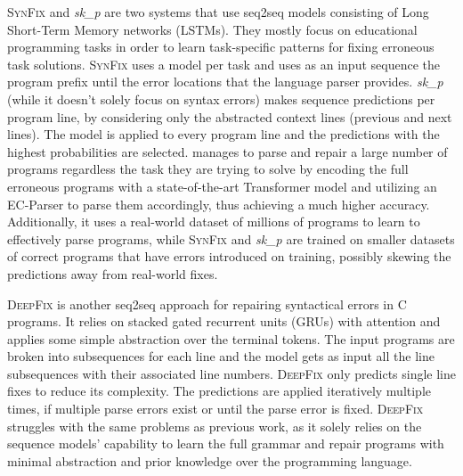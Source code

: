 %
\textsc{SynFix} \citep{Bhatia2016} and \emph{sk\_p} \citep{Pu2016} are two
systems that use seq2seq models consisting of Long Short-Term Memory networks
(LSTMs). They mostly focus on educational programming tasks in order to learn
task-specific patterns for fixing erroneous task solutions. \textsc{SynFix} uses
a model per task and uses as an input sequence the program prefix until the
error locations that the language parser provides. \emph{sk\_p} (while it
doesn't solely focus on syntax errors) makes sequence predictions per program
line, by considering only the abstracted context lines (previous and next
lines). The model is applied to every program line and the predictions with the
highest probabilities are selected. \toolname manages to parse and repair a
large number of programs regardless the task they are trying to solve by
encoding the full erroneous programs with a state-of-the-art Transformer model
and utilizing an EC-Parser to parse them accordingly, thus achieving a much
higher accuracy. Additionally, it uses a real-world dataset of millions of
\python programs to learn to effectively parse programs, while \textsc{SynFix}
and \emph{sk\_p} are trained on smaller datasets of correct programs that have
errors introduced on training, possibly skewing the predictions away from
real-world fixes.

\textsc{DeepFix} \citep{Gupta2017} is another seq2seq approach for repairing
syntactical errors in \textsc{C} programs. It relies on stacked gated recurrent
units (GRUs) with attention and applies some simple abstraction over the
terminal tokens. The input programs are broken into subsequences for each line
and the model gets as input all the line subsequences with their associated line
numbers. \textsc{DeepFix} only predicts single line fixes to reduce its
complexity. The predictions are applied iteratively multiple times, if multiple
parse errors exist or until the parse error is fixed. \textsc{DeepFix} struggles
with the same problems as previous work, as it solely relies on the sequence
models' capability to learn the full grammar and repair programs with minimal
abstraction and prior knowledge over the programming language.

